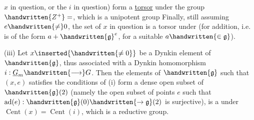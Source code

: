 $x$ in question, or the $i$ in question) form a \uline{torsor} under the group $\handwritten{Z^+}=$, which is a unipotent group
Finally, still assuming $e\handwritten{\ne}0$, the set of $x$ in question is a torsor under  (for addition, i.e. is of the form $a+\handwritten{\mathfrak{g}}^e$, for a suitable $a\handwritten{\in\mathfrak{g}}$). 

(iii) Let $x\inserted{\handwritten{\ne0}}$ be a Dynkin element of $\handwritten{\mathfrak{g}}$, thus associated with a Dynkin homomorphism $i:\underline{G}_m\handwritten{\longrightarrow}G$. Then the elements of $\handwritten{\mathfrak{g}}$ such that $(x,e)$ satisfies the conditions of (i) form a dense open subset of $\handwritten{\mathfrak{g}}(2)$ (namely the open subset of points $e$ such that $\operatorname{ad}(e):\handwritten{\mathfrak{g}}(0)\handwritten{\to\mathfrak{g}}(2)$ is surjective),  is a  under$\operatorname{Cent}(x)=\operatorname{Cent}(i)$, which is a reductive group.

